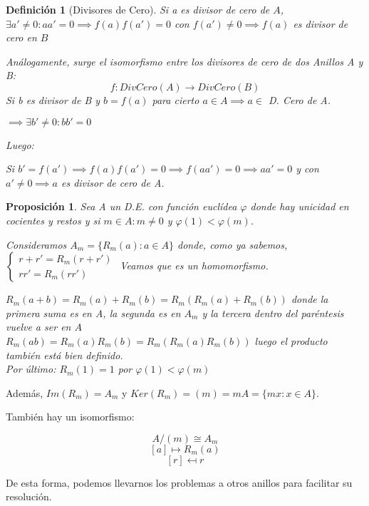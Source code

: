 \documentclass[11pt, a4paper, titlepage]{article}
\makeatletter
\renewenvironment{proof}[1][\proofname] {\vspace{-15pt}\par\pushQED{\qed}\normalfont\topsep6\p@\@plus6\p@\relax\trivlist\item[\hskip\labelsep\it#1\@addpunct{.}]\ignorespaces}{\popQED\endtrivlist\@endpefalse}
\theoremstyle{theorem-style}
\newtheorem*{nprop}{Proposición}
\theoremstyle{definition-style}
\newtheorem*{ndef}{Definición}
\theoremstyle{remark-style}
\theoremstyle{example-style}
\makeatother
\begin{document}
\begin{ndef}[Divisores de Cero]
	Si a es divisor de cero de $A$, $\exists a'\ne 0 : aa' = 0 \implies f(a)f(a') = 0$ con $f(a') \ne 0 \implies f(a)$ es divisor de cero en $B$
	
	Análogamente, surge el isomorfismo entre los divisores de cero de dos Anillos A y B:
	$$f: DivCero(A) \to DivCero(B)$$ Si b es divisor de B y $b=f(a)$ para cierto $a \in A\implies  a \in $ D. Cero de A.
	
	$\implies \exists b' \ne 0 : bb' = 0$
	
	Luego:
	
	Si $b' = f(a')\implies f(a)f(a') = 0 \implies f(aa') = 0 \implies aa' = 0$ y con $a'\ne 0 \implies a$ es divisor de cero de A.
\end{ndef}

\begin{nprop}
		Sea A un D.E. con función euclídea $\varphi$ donde hay unicidad en cocientes y restos y si $m\in A: m\ne 0$ y $ \varphi(1) < \varphi(m)$.
	
		Consideramos $A_m = \{R_m(a): a \in A\}$ donde, como ya sabemos, $\begin{cases}
	r+r' = R_m(r+r')\\
	rr' = R_m(rr')
\end{cases}$ Veamos que es un homomorfismo.\\
\begin{proof}
	$R_m(a+b) = R_m(a) + R_m(b) = R_m(R_m(a)+R_m(b))$ donde la primera suma es en A, la segunda es en $A_m$ y la tercera dentro del paréntesis vuelve a ser en $A$\\
	$R_m(ab) = R_m(a)R_m(b) = R_m(R_m(a)R_m(b))$ luego el producto también está bien definido.\\
	Por último: $R_m(1) = 1$ por $\varphi(1) < \varphi(m)$
\end{proof}
\end{nprop}
Además, $Im(R_m) = A_m$ y $Ker(R_m) = (m) = mA = \{mx : x\in A\}$.

También hay un isomorfismo:

\[
A/(m)  \cong A_m
\]\[
[a]\mapsto R_m(a)
\]\[
[r] \mapsfrom r
\]

De esta forma, podemos llevarnos los problemas a otros anillos para facilitar su resolución.
\end{document}
